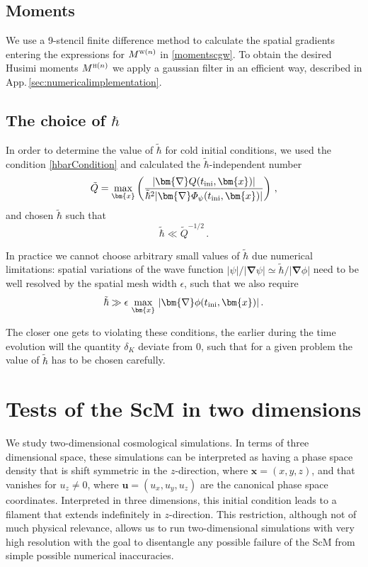 \documentclass[twocolumn, nofootinbib, showpacs, superscriptaddress]{revtex4-1}
\renewcommand{\H}[0]{{\textsc{h}}}
\newcommand{\W}[0]{{\textsc{w}}}
\newcommand{\thbar}{\tilde\hbar}
\newcommand{\vx}[0]{\bm{x} }
\newcommand{\vu}[0]{\bm{u} }
\newcommand{\vnabla}[0]{\bm{\nabla} }
\begin{document}
\subsection{Moments}
We use a 9-stencil finite difference method to calculate the spatial gradients entering the expressions for $M^{\W(n)}$ in \eqref{momentscgw}. 
To obtain the desired Husimi moments $M^{\H(n)}$ we apply a gaussian filter in an efficient way, described in App.\,\ref{sec:numericalimplementation}.

\subsection{The choice of $\hbar$}


In order to determine the value of $\thbar$ for cold initial conditions, we used the condition \eqref{hbarCondition} and calculated 
the $\thbar$-independent number 
\begin{equation}
\tilde{Q} =\max_{\vx}\left(\frac{|\vnabla Q(t_{\rm ini},\vx)| }{\thbar^2 | \vnabla \varPhi_\psi(t_{\rm ini},\vx) | }\right)\,,
\end{equation}
 and chosen $\thbar$ such that 
 \begin{equation}
 \thbar \ll \tilde{Q}^{-1/2} \,.
 \end{equation}
 
In practice we cannot choose arbitrary small values of $\thbar$ due numerical limitations:  spatial variations of the wave function $|\psi|/|\vnabla \psi| \simeq \thbar/|\vnabla \phi|$ need to be well resolved by the spatial mesh width $\epsilon$, such that we also require 
\begin{equation}
\thbar \gg \epsilon\, \max_{\vx} \,|\vnabla \phi (t_{\rm ini},\vx)| \,.
\end{equation}

 The closer one gets to violating these conditions, the earlier during the time evolution will the quantity $\delta_K$ deviate from 0, such that for a given problem the value of $\thbar$ has to be chosen carefully.



\section{Tests of the ScM in two dimensions}
 \label{sec:numerics}
We study two-dimensional cosmological simulations. 
In terms of three dimensional space, these simulations can be interpreted as having a phase space density that is shift symmetric in the $z$-direction, 
where $\vx=(x,y,z)$, and that vanishes for $u_z\neq0$, where $\vu=(u_x,u_y,u_z)$ are the canonical phase space coordinates.
Interpreted in three dimensions, this initial condition leads to a filament  that extends indefinitely in $z$-direction. 
This restriction, although not of much physical relevance, allows us to run two-dimensional simulations with very high resolution with the goal to disentangle any possible failure of the ScM from simple possible numerical inaccuracies.
\end{document}
